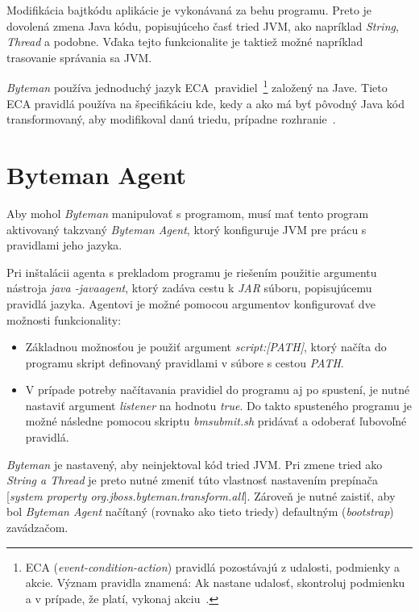 \documentclass[11pt,final,oneside]{fithesis}
\begin{document}
Modifikácia bajtkódu aplikácie je vykonávaná za behu programu. Preto je 
dovolená zmena Java kódu, popisujúceho časť tried JVM, ako napríklad
\textit{String}, \textit{Thread} a podobne. Vďaka tejto funkcionalite je 
taktiež možné napríklad trasovanie správania sa JVM.

\textit{Byteman} používa jednoduchý jazyk
ECA~pravidiel~\footnote{ECA (\textit{event-condition-action}) pravidlá 
pozostávajú z udalosti, podmienky a akcie. Význam pravidla znamená: Ak nastane 
udalosť, skontroluj podmienku a v prípade, že platí, vykonaj
akciu~\cite{Sellis:ECARules}.} založený na Jave. Tieto ECA pravidlá
používa na špecifikáciu kde, kedy a ako má byť pôvodný Java kód transformovaný,
aby modifikoval danú triedu, prípadne rozhranie~\cite{RedHat:Byteman}.

\section{Byteman Agent}

Aby mohol \textit{Byteman} manipulovať s programom, musí mať tento program 
aktivovaný takzvaný \textit{Byteman Agent}, ktorý konfiguruje JVM pre prácu s 
pravidlami jeho jazyka.

Pri inštalácii agenta s prekladom programu je riešením použitie argumentu
nástroja \textit{java -javaagent}, ktorý zadáva cestu k \textit{JAR} súboru,
popisujúcemu pravidlá jazyka. Agentovi je možné pomocou argumentov
konfigurovať dve možnosti funkcionality:

\begin{itemize}
\item Základnou možnosťou je použiť argument \textit{script:[PATH]}, ktorý
načíta do programu skript definovaný pravidlami v súbore s cestou
\textit{PATH}.
\item V prípade potreby načítavania pravidiel do programu aj po spustení, je 
nutné nastaviť argument \textit{listener} na hodnotu \textit{true}. Do takto
spusteného programu je možné následne pomocou skriptu \textit{bmsubmit.sh}
pridávať a odoberať ľubovoľné pravidlá.
\end{itemize}

\textit{Byteman} je nastavený, aby neinjektoval kód tried JVM. Pri zmene tried
ako \textit{String a Thread} je preto nutné zmeniť túto vlastnosť
nastavením prepínača
[\textit{system property org.jboss.byteman.transform.all}]. Zároveň je
nutné zaistiť, aby bol \textit{Byteman Agent} načítaný (rovnako ako tieto 
triedy) defaultným (\textit{bootstrap}) zavádzačom.
\end{document}
